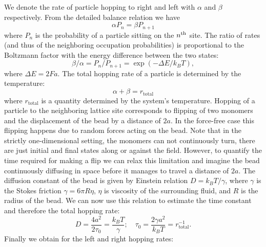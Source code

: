 \documentclass[aps,showpacs,twocolumn,floatfix,prx,superscriptaddress]{revtex4-1}
\begin{document}
 We denote the rate of particle hopping to right and left with
$\alpha$ and $\beta$ respectively. From the detailed balance relation we have \begin{equation}
    \alpha P_{n} = \beta P_{n+1} \label{eq:db}
\end{equation}
where $P_{n}$ is the probability of a particle sitting
on the $n^{\rm{th}}$ site. The ratio of rates (and thus of the neighboring occupation probabilities)
is proportional to the Boltzmann
factor with the energy difference between the two states:
\begin{equation}
    \beta / \alpha = P_{n} / P_{n+1} = \exp{(-\Delta E / k_B T)},  \label{eq:r_divide_l}
\end{equation}
where  $\Delta E = 2Fa$.
The total hopping rate of a particle is determined by the temperature:
\begin{equation}
    \alpha + \beta = r_{\text{total}} \label{eq:l_plus_r}
\end{equation}
where $r_{\text{total}}$ is a quantity determined by the system's temperature. Hopping of a particle to the neighboring lattice site corresponds to flipping of two monomers and the displacement of the bead by a distance of $2a$. In the force-free case this flipping happens due to random forces acting on the bead. Note that in the strictly one-dimensional setting, the monomers can not continuously turn, there are just initial and final states along or against the field. However, to quantify the time required for making a flip we can relax this limitation and imagine the bead continuously diffusing in space before it manages to travel a distance of $2a$. The diffusion constant of the bead is given by Einstein relation $D=k_{B}T/\gamma$, where $\gamma$ is the Stokes friction $\gamma=6\pi R\eta$, $\eta$ is viscosity of the surrounding fluid, and $R$ is the radius of the bead. We can now use this relation to estimate the time constant and therefore the total hopping rate:
\begin{equation}
    \label{eq:timeScale}
D=\frac{4a^2}{2\tau_0}=\frac{k_{B}T}{\gamma}; \quad \tau_0=\frac{2\gamma a^2}{k_{B}T}=r_{\text{total}}^{-1}.
\end{equation}
Finally we obtain for the left and right hopping rates:
\end{document}
